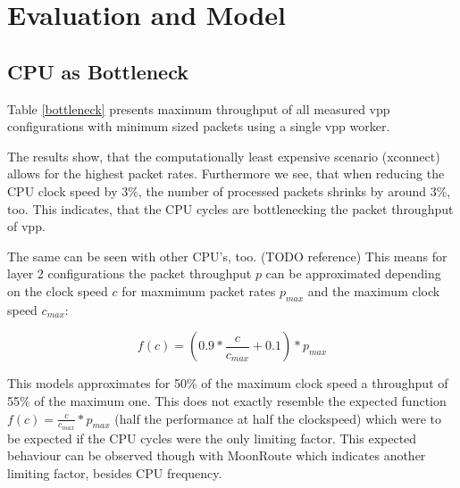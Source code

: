 \section{Evaluation and Model}







\subsection{CPU as Bottleneck}
\label{sec:cpubottleneck}

Table \ref{bottleneck} presents maximum throughput of all
measured \Ac{vpp} configurations with minimum sized packets using a single \Ac{vpp}
worker. 

The results show, that the computationally least expensive scenario
(xconnect) allows for the highest packet rates. Furthermore we see,
that when reducing the CPU clock speed by 3\%, the number of processed
packets shrinks by around 3\%, too. This indicates, that the CPU
cycles are bottlenecking the packet throughput of \Ac{vpp}.

The same can be seen with other CPU's, too. (TODO reference) This
means for layer 2 configurations the packet throughput $p$ can be
approximated depending on the clock speed $c$ for maxmimum packet
rates $p_{max}$ and the maximum clock speed $c_{max}$:


$$ f(c) = (0.9 * \frac{c}{c_{max}} + 0.1) * p_{max} $$

This models approximates for 50\% of the maximum clock speed a
throughput of 55\% of the maximum one. This does not exactly resemble
the expected function $f(c) = \frac{c}{c_{max}} * p_{max}$ (half
the performance at half the clockspeed) which were to be expected if
the CPU cycles were the only limiting factor. This expected behaviour
can be observed though with MoonRoute \cite{chair:architecture} which
indicates another limiting factor, besides CPU
frequency.

